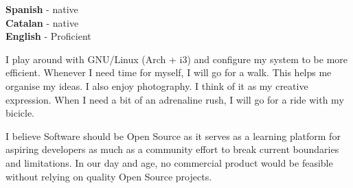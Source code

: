\documentclass[9pt]{developercv} %
\begin{document}
\begin{minipage}[t]{0.3\textwidth}
	\vspace{-\baselineskip} %

	
	\textbf{Spanish} - native\\
	\textbf{Catalan} - native\\
	\textbf{English} - Proficient
\end{minipage}
\hfill
\begin{minipage}[t]{0.3\textwidth}
	\vspace{-\baselineskip} %
	
	
	
	I play around with GNU/Linux (Arch + i3) and configure my system to be more efficient.
	Whenever I need time for myself, I will go for a walk. This helps me organise my ideas.
	I also enjoy photography. I think of it as my creative expression.
	When I need a bit of an adrenaline rush, I will go for a ride with my bicicle.
\end{minipage}
\hfill
\begin{minipage}[t]{0.3\textwidth}
	\vspace{-\baselineskip} %
	
	
	I believe Software should be Open Source as it serves as a learning platform for aspiring developers as much as a community effort to break current boundaries and limitations. In our day and age, no commercial product would be feasible without relying on quality Open Source projects.
\end{minipage}

\end{document}
